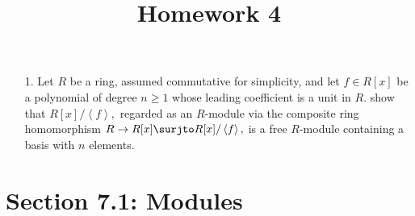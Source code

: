 \documentclass{article}
\begin{document}
\title{Homework 4}
\maketitle
\thispagestyle{fancy}

\begin{itemize}
	\item[1.] Let $R$ be a ring, assumed commutative for simplicity, and let $f\in R[x]$ be a polynomial of degree $n\ge 1$ whose leading coefficient is a unit in $R.$ show that $R[x]/\left< f\right>,$ regarded as an $R$-module via the composite ring homomorphism $R\to R[x]\surjto R[x]/\left< f\right>,$ is a free $R$-module containing a basis with $n$ elements.
		
\end{itemize}

\section*{Section 7.1: Modules}
\end{document}
